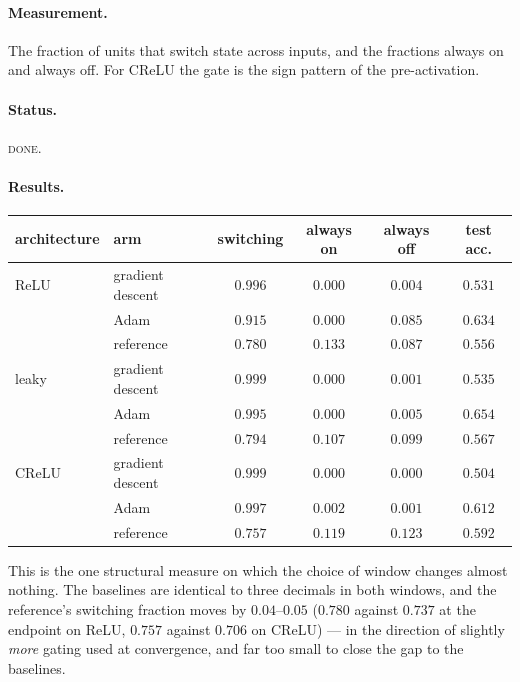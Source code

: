 \documentclass{article} %
\theoremstyle{plain}
\theoremstyle{definition}
\theoremstyle{remark}
\begin{document}
\paragraph{Measurement.} The fraction of units that switch state across inputs, and the fractions
always on and always off. For CReLU the gate is the sign pattern of the pre-activation.

\paragraph{Status.} \textsc{done}.

\paragraph{Results.}

\begin{center}\small
\begin{tabular}{llcccc}
\toprule
architecture & arm & switching & always on & always off & test acc. \\
\midrule
ReLU  & gradient descent & $0.996$ & $0.000$ & $0.004$ & $0.531$ \\
      & Adam             & $0.915$ & $0.000$ & $0.085$ & $0.634$ \\
      & reference        & $0.780$ & $0.133$ & $0.087$ & $0.556$ \\
\midrule
leaky & gradient descent & $0.999$ & $0.000$ & $0.001$ & $0.535$ \\
      & Adam             & $0.995$ & $0.000$ & $0.005$ & $0.654$ \\
      & reference        & $0.794$ & $0.107$ & $0.099$ & $0.567$ \\
\midrule
CReLU & gradient descent & $0.999$ & $0.000$ & $0.000$ & $0.504$ \\
      & Adam             & $0.997$ & $0.002$ & $0.001$ & $0.612$ \\
      & reference        & $0.757$ & $0.119$ & $0.123$ & $0.592$ \\
\bottomrule
\end{tabular}
\end{center}

\noindent This is the one structural measure on which the choice of window changes almost nothing.
The baselines are identical to three decimals in both windows, and the reference's switching
fraction moves by $0.04$--$0.05$ ($0.780$ against $0.737$ at the endpoint on ReLU, $0.757$ against
$0.706$ on CReLU) --- in the direction of slightly \emph{more} gating used at convergence, and far
too small to close the gap to the baselines.
\end{document}
